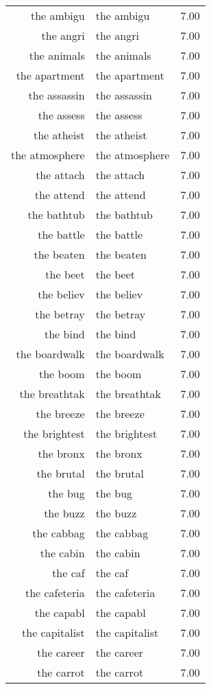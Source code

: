 \begin{table}[ht]
\begin{tabular}{rlr}
  the ambigu & the ambigu & 7.00 \\ 
  the angri & the angri & 7.00 \\ 
  the animals & the animals & 7.00 \\ 
  the apartment & the apartment & 7.00 \\ 
  the assassin & the assassin & 7.00 \\ 
  the assess & the assess & 7.00 \\ 
  the atheist & the atheist & 7.00 \\ 
  the atmosphere & the atmosphere & 7.00 \\ 
  the attach & the attach & 7.00 \\ 
  the attend & the attend & 7.00 \\ 
  the bathtub & the bathtub & 7.00 \\ 
  the battle & the battle & 7.00 \\ 
  the beaten & the beaten & 7.00 \\ 
  the beet & the beet & 7.00 \\ 
  the believ & the believ & 7.00 \\ 
  the betray & the betray & 7.00 \\ 
  the bind & the bind & 7.00 \\ 
  the boardwalk & the boardwalk & 7.00 \\ 
  the boom & the boom & 7.00 \\ 
  the breathtak & the breathtak & 7.00 \\ 
  the breeze & the breeze & 7.00 \\ 
  the brightest & the brightest & 7.00 \\ 
  the bronx & the bronx & 7.00 \\ 
  the brutal & the brutal & 7.00 \\ 
  the bug & the bug & 7.00 \\ 
  the buzz & the buzz & 7.00 \\ 
  the cabbag & the cabbag & 7.00 \\ 
  the cabin & the cabin & 7.00 \\ 
  the caf & the caf & 7.00 \\ 
  the cafeteria & the cafeteria & 7.00 \\ 
  the capabl & the capabl & 7.00 \\ 
  the capitalist & the capitalist & 7.00 \\ 
  the career & the career & 7.00 \\ 
  the carrot & the carrot & 7.00 \\ 

\end{tabular}
\end{table}
